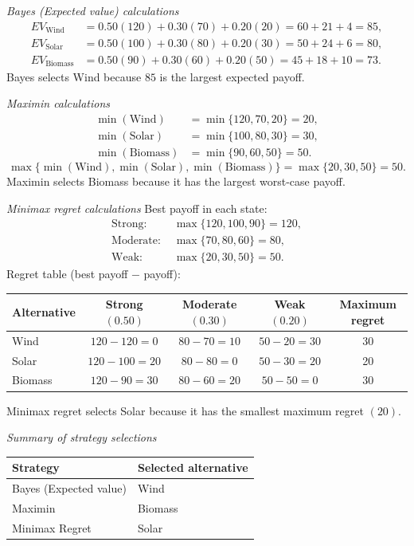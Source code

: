 \begin{ExamProblems}
		\textit{Bayes (Expected value) calculations}
		\[
		\begin{aligned}
		EV_{\text{Wind}} &= 0.50(120)+0.30(70)+0.20(20)=60+21+4=85,\\
		EV_{\text{Solar}} &= 0.50(100)+0.30(80)+0.20(30)=50+24+6=80,\\
		EV_{\text{Biomass}} &= 0.50(90)+0.30(60)+0.20(50)=45+18+10=73.
		\end{aligned}
		\]
		Bayes selects Wind because $85$ is the largest expected payoff.
		
		\textit{Maximin calculations}
		\[
		\begin{aligned}
		\min(\text{Wind}) &= \min\{120,70,20\}=20,\\
		\min(\text{Solar}) &= \min\{100,80,30\}=30,\\
		\min(\text{Biomass}) &= \min\{90,60,50\}=50.
		\end{aligned}
		\]
		\[
		\max\{\min(\text{Wind}),\min(\text{Solar}),\min(\text{Biomass})\}=\max\{20,30,50\}=50.
		\]
		Maximin selects Biomass because it has the largest worst-case payoff.
		
		\textit{Minimax regret calculations}
		Best payoff in each state:
		\[
		\begin{aligned}
		\text{Strong: } &\max\{120,100,90\}=120,\\
		\text{Moderate: } &\max\{70,80,60\}=80,\\
		\text{Weak: } &\max\{20,30,50\}=50.
		\end{aligned}
		\]
		Regret table (best payoff $-$ payoff):
		\begin{center}
			\begin{tabular}{l c c c c}
				\toprule
				Alternative & Strong $(0.50)$ & Moderate $(0.30)$ & Weak $(0.20)$ & Maximum regret \\
				\midrule
				Wind & $120-120=0$ & $80-70=10$ & $50-20=30$ & 30 \\
				Solar & $120-100=20$ & $80-80=0$ & $50-30=20$ & 20 \\
				Biomass & $120-90=30$ & $80-60=20$ & $50-50=0$ & 30 \\
				\bottomrule
			\end{tabular}
		\end{center}
		Minimax regret selects Solar because it has the smallest maximum regret $(20)$.
		
		\textit{Summary of strategy selections}
		\begin{center}
			\begin{tabular}{l l}
				\toprule
				Strategy & Selected alternative \\
				\midrule
				Bayes (Expected value) & Wind \\
				Maximin & Biomass \\
				Minimax Regret & Solar \\
				\bottomrule
			\end{tabular}
		\end{center}
	\end{ExamProblems}

